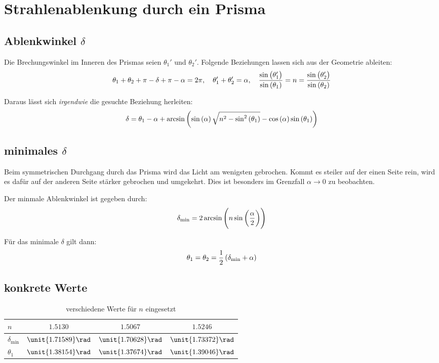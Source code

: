 \documentclass[11pt, ngerman, fleqn]{article}
\newcommand{\half}{\frac 12}
\begin{document}

\section{Strahlenablenkung durch ein Prisma}

\subsection{Ablenkwinkel $\delta$}

Die Brechungswinkel im Inneren des Prismas seien $\theta_1'$ und $\theta_2'$.
Folgende Beziehungen lassen sich aus der Geometrie ableiten:
\[
	\theta_1 + \theta_2 + \pi - \delta + \pi - \alpha = 2 \pi
	,\quad
	\theta_1' + \theta_2' = \alpha
	,\quad
	\frac{\sin\del{\theta_1'}}{\sin\del{\theta_1}} = n = \frac{\sin\del{\theta_2'}}{\sin\del{\theta_2}}
\]

Daraus lässt sich \emph{irgendwie} die gesuchte Beziehung herleiten:
\[
	\delta = \theta_1 - \alpha + \arcsin\del{\sin\del\alpha \sqrt{n^2 - \sin^2\del{\theta_1}} - \cos\del\alpha \sin\del{\theta_1}}
\]

\subsection{minimales $\delta$}

Beim symmetrischen Durchgang durch das Prisma wird das Licht am wenigsten
gebrochen. Kommt es steiler auf der einen Seite rein, wird es dafür auf der
anderen Seite stärker gebrochen und umgekehrt. Dies ist besonders im Grenzfall
$\alpha \to 0$ zu beobachten.

Der minmale Ablenkwinkel ist gegeben durch:
\[
	\delta_\text{min} = 2 \arcsin\del{n \sin\del{\frac \alpha2}}
\]

Für das minimale $\delta$ gilt dann:
\[
	\theta_1 = \theta_2 = \half \del{\delta_\text{min} + \alpha}
\]

\subsection{konkrete Werte}

\begin{table}[h!]
	\centering
	\begin{tabular}{l|ccc}
		$n$ & $1.5130$ & $1.5067$ & $1.5246$ \\
		\hline
		$\delta_\text{min}$ & $\unit{1.71589}\rad$ & $\unit{1.70628}\rad$ & $\unit{1.73372}\rad$ \\
			  $\theta_1$ & $\unit{1.38154}\rad$ & $\unit{1.37674}\rad$ & $\unit{1.39046}\rad$ \\
	\end{tabular}
	\caption{verschiedene Werte für $n$ eingesetzt}
\end{table}

%
%
\end{document}
